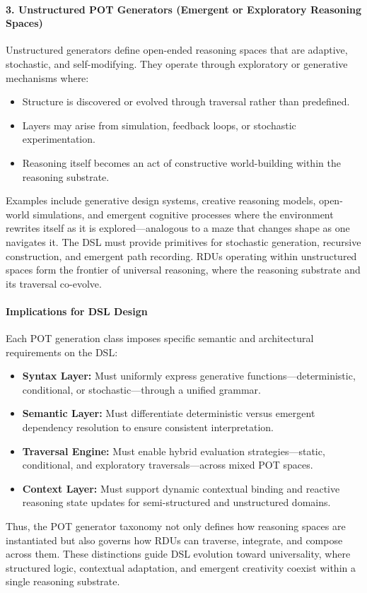 \documentclass[11pt]{article}
\begin{document}
\paragraph{3. Unstructured POT Generators (Emergent or Exploratory Reasoning Spaces)}
Unstructured generators define open-ended reasoning spaces that are adaptive, stochastic, and self-modifying. They operate through exploratory or generative mechanisms where:
\begin{itemize}
    \item Structure is discovered or evolved through traversal rather than predefined.
    \item Layers may arise from simulation, feedback loops, or stochastic experimentation.
    \item Reasoning itself becomes an act of constructive world-building within the reasoning substrate.
\end{itemize}
Examples include generative design systems, creative reasoning models, open-world simulations, and emergent cognitive processes where the environment rewrites itself as it is explored—analogous to a maze that changes shape as one navigates it.  
The DSL must provide primitives for stochastic generation, recursive construction, and emergent path recording. RDUs operating within unstructured spaces form the frontier of universal reasoning, where the reasoning substrate and its traversal co-evolve.

\paragraph{Implications for DSL Design}
Each POT generation class imposes specific semantic and architectural requirements on the DSL:
\begin{itemize}
    \item \textbf{Syntax Layer:} Must uniformly express generative functions—deterministic, conditional, or stochastic—through a unified grammar.
    \item \textbf{Semantic Layer:} Must differentiate deterministic versus emergent dependency resolution to ensure consistent interpretation.
    \item \textbf{Traversal Engine:} Must enable hybrid evaluation strategies—static, conditional, and exploratory traversals—across mixed POT spaces.
    \item \textbf{Context Layer:} Must support dynamic contextual binding and reactive reasoning state updates for semi-structured and unstructured domains.
\end{itemize}
Thus, the POT generator taxonomy not only defines how reasoning spaces are instantiated but also governs how RDUs can traverse, integrate, and compose across them. These distinctions guide DSL evolution toward universality, where structured logic, contextual adaptation, and emergent creativity coexist within a single reasoning substrate.
\end{document}
